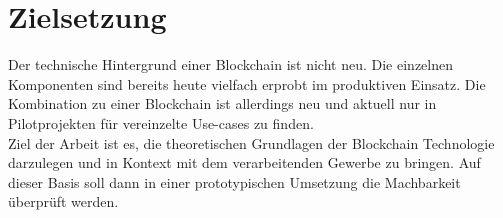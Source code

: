 \section{Zielsetzung}

Der technische Hintergrund einer Blockchain ist nicht neu. Die einzelnen Komponenten sind bereits heute vielfach erprobt im produktiven Einsatz. \cite{Diffie1976}\cite{Steinmetz2005} Die Kombination zu einer Blockchain ist allerdings neu und aktuell nur in Pilotprojekten für vereinzelte Use-cases zu finden.\\

Ziel der Arbeit ist es, die theoretischen Grundlagen der Blockchain Technologie darzulegen und in Kontext mit dem verarbeitenden Gewerbe zu bringen. Auf dieser Basis soll dann in einer prototypischen Umsetzung die Machbarkeit überprüft werden.



\newpage
